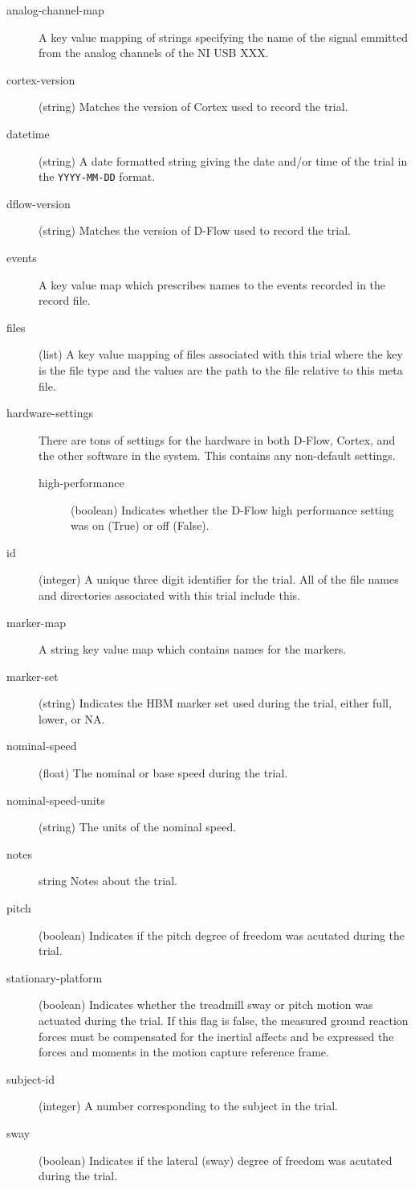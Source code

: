 \documentclass[10pt,a4paper,twocolumn]{article}
\begin{document}
\begin{description}
  \item[analog-channel-map] A key value mapping of strings specifying the name
    of the signal emmitted from the analog channels of the NI USB XXX.
  \item[cortex-version] (string) Matches the version of Cortex used to record
    the trial.
  \item[datetime] (string) A date formatted string giving the date and/or time
    of the trial in the \verb|YYYY-MM-DD| format.
  \item[dflow-version] (string) Matches the version of D-Flow used to record
    the trial.
  \item[events] A key value map which prescribes names to the events recorded
    in the record file.
  \item[files] (list) A key value mapping of files associated with this trial
    where the key is the file type and the values are the path to the file
    relative to this meta file.
  \item[hardware-settings] There are tons of settings for the hardware in both
    D-Flow, Cortex, and the other software in the system. This contains any
    non-default settings.
    \begin{description}
      \item[high-performance] (boolean) Indicates whether the D-Flow high
        performance setting was on (True) or off (False).
    \end{description}
  \item[id] (integer) A unique three digit identifier for the trial. All of the
    file names and directories associated with this trial include this.
  \item[marker-map] A string key value map which contains names for the
    markers.
  \item[marker-set] (string) Indicates the HBM \cite{Bogert2013} marker
    set used during the trial, either full, lower, or NA.
  \item[nominal-speed] (float) The nominal or base speed during the trial.
  \item[nominal-speed-units] (string) The units of the nominal speed.
  \item[notes] {string} Notes about the trial.
  \item[pitch] (boolean) Indicates if the pitch degree of freedom was acutated
    during the trial.
  \item[stationary-platform] (boolean) Indicates whether the treadmill
      sway or pitch motion was actuated during the trial. If this flag is
      false, the measured ground reaction forces must be compensated for the
      inertial affects and be expressed the forces and moments in the motion
      capture reference frame.
  \item[subject-id] (integer) A number corresponding to the subject in the
    trial.
  \item[sway] (boolean) Indicates if the lateral (sway) degree of freedom was
    acutated during the trial.
\end{description}
\end{document}
